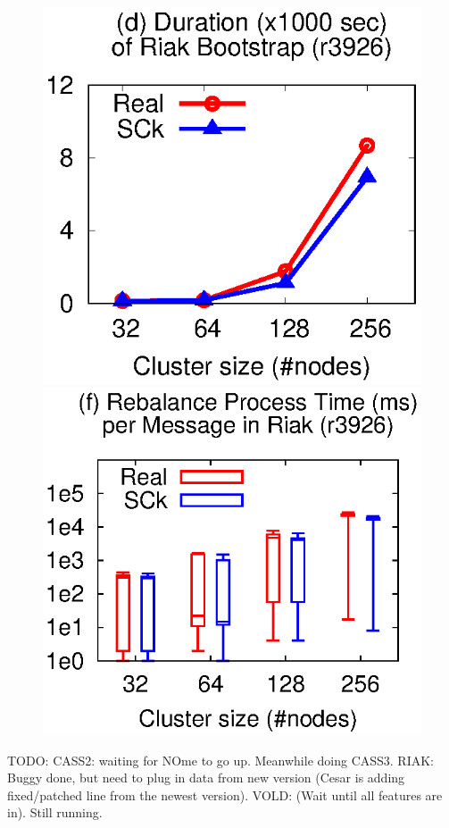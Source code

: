 \begin{figure}
\centerline{
\includegraphics[width=\fgw]{F/old-bugs/eps/riak1.eps}
\includegraphics[width=\fgw]{F/riak/eps/proc.eps}
}

\vminfive

\vminfive
\end{figure}




TODO: CASS2: waiting for NOme to go up.
Meanwhile doing CASS3. 
%
RIAK: Buggy done, but need to plug in data from new version
(Cesar is adding fixed/patched line from the newest version).
%
VOLD: (Wait until all features are in).  Still running.
\fi
